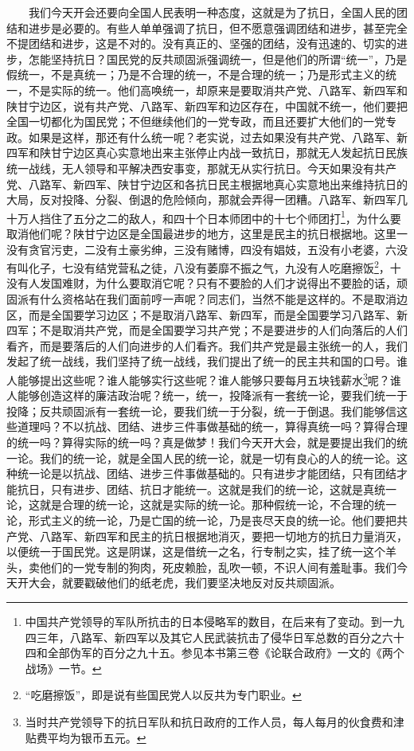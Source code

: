 \documentclass[cn,11pt,chinese]{elegantbook}
\begin{document}
　　我们今天开会还要向全国人民表明一种态度，这就是为了抗日，全国人民的团结和进步是必要的。有些人单单强调了抗日，但不愿意强调团结和进步，甚至完全不提团结和进步，这是不对的。没有真正的、坚强的团结，没有迅速的、切实的进步，怎能坚持抗日？国民党的反共顽固派强调统一，但是他们的所谓“统一”，乃是假统一，不是真统一；乃是不合理的统一，不是合理的统一；乃是形式主义的统一，不是实际的统一。他们高唤统一，却原来是要取消共产党、八路军、新四军和陕甘宁边区，说有共产党、八路军、新四军和边区存在，中国就不统一，他们要把全国一切都化为国民党；不但继续他们的一党专政，而且还要扩大他们的一党专政。如果是这样，那还有什么统一呢？老实说，过去如果没有共产党、八路军、新四军和陕甘宁边区真心实意地出来主张停止内战一致抗日，那就无人发起抗日民族统一战线，无人领导和平解决西安事变，那就无从实行抗日。今天如果没有共产党、八路军、新四军、陕甘宁边区和各抗日民主根据地真心实意地出来维持抗日的大局，反对投降、分裂、倒退的危险倾向，那就会弄得一团糟。八路军、新四军几十万人挡住了五分之二的敌人，和四十个日本师团中的十七个师团打\footnote[12]{ 中国共产党领导的军队所抗击的日本侵略军的数目，在后来有了变动。到一九四三年，八路军、新四军以及其它人民武装抗击了侵华日军总数的百分之六十四和全部伪军的百分之九十五。参见本书第三卷《论联合政府》一文的《两个战场》一节。}，为什么要取消他们呢？陕甘宁边区是全国最进步的地方，这里是民主的抗日根据地。这里一没有贪官污吏，二没有土豪劣绅，三没有赌博，四没有娼妓，五没有小老婆，六没有叫化子，七没有结党营私之徒，八没有萎靡不振之气，九没有人吃磨擦饭\footnote[13]{ “吃磨擦饭”，即是说有些国民党人以反共为专门职业。}，十没有人发国难财，为什么要取消它呢？只有不要脸的人们才说得出不要脸的话，顽固派有什么资格站在我们面前哼一声呢？同志们，当然不能是这样的。不是取消边区，而是全国要学习边区；不是取消八路军、新四军，而是全国要学习八路军、新四军；不是取消共产党，而是全国要学习共产党；不是要进步的人们向落后的人们看齐，而是要落后的人们向进步的人们看齐。我们共产党是最主张统一的人，我们发起了统一战线，我们坚持了统一战线，我们提出了统一的民主共和国的口号。谁人能够提出这些呢？谁人能够实行这些呢？谁人能够只要每月五块钱薪水\footnote[14]{ 当时共产党领导下的抗日军队和抗日政府的工作人员，每人每月的伙食费和津贴费平均为银币五元。}呢？谁人能够创造这样的廉洁政治呢？统一，统一，投降派有一套统一论，要我们统一于投降；反共顽固派有一套统一论，要我们统一于分裂，统一于倒退。我们能够信这些道理吗？不以抗战、团结、进步三件事做基础的统一，算得真统一吗？算得合理的统一吗？算得实际的统一吗？真是做梦！我们今天开大会，就是要提出我们的统一论。我们的统一论，就是全国人民的统一论，就是一切有良心的人的统一论。这种统一论是以抗战、团结、进步三件事做基础的。只有进步才能团结，只有团结才能抗日，只有进步、团结、抗日才能统一。这就是我们的统一论，这就是真统一论，这就是合理的统一论，这就是实际的统一论。那种假统一论，不合理的统一论，形式主义的统一论，乃是亡国的统一论，乃是丧尽天良的统一论。他们要把共产党、八路军、新四军和民主的抗日根据地消灭，要把一切地方的抗日力量消灭，以便统一于国民党。这是阴谋，这是借统一之名，行专制之实，挂了统一这个羊头，卖他们的一党专制的狗肉，死皮赖脸，乱吹一顿，不识人间有羞耻事。我们今天开大会，就要戳破他们的纸老虎，我们要坚决地反对反共顽固派。\\
\end{document}

